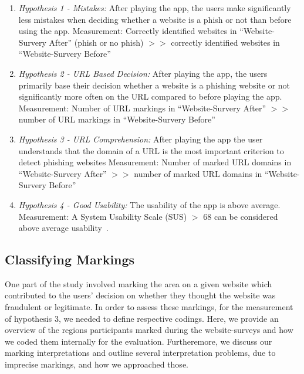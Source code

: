 \begin{enumerate}
	\item \textit{Hypothesis 1 - Mistakes:} After playing the app, the users make significantly less mistakes when deciding whether a website is a phish or not than before using the app.\newline
	Measurement: Correctly identified websites in ``Website-Survery After'' (phish or no phish) $>>$ correctly identified websites in ``Website-Survery Before''
	\item \textit{Hypothesis 2 - URL Based Decision:} After playing the app, the users primarily base their decision whether a website is a phishing website or not significantly more often on the URL compared to before playing the app.\newline
	Measurement: Number of URL markings in ``Website-Survery After'' $>>$ number of URL markings in ``Website-Survery Before''
	\item \textit{Hypothesis 3 - URL Comprehension:} After playing the app the user understands that the domain of a URL is the most important criterion to detect phishing websites\newline
Measurement: Number of marked URL domains in ``Website-Survery After''  $>>$ number of marked URL domains in ``Website-Survery Before'' 
	\item \textit{Hypothesis 4 - Good Usability:} The usability of the app is above average. \newline
Measurement: A System Usability Scale (SUS) $>$ 68 can be considered above average usability~\cite{sus}.
\end{enumerate}

\subsection{Classifying Markings}
\label{s:markings}
One part of the study involved marking the area on a given website which contributed to the users' decision on whether they thought the website was fraudulent or legitimate.
In order to assess these markings, for the measurement of hypothesis 3, we needed to define respective codings.
Here, we provide an overview of the regions participants marked during the website-surveys and how we coded them internally for the evaluation.
Furtheremore, we discuss our marking interpretations and outline several interpretation problems, due to imprecise markings, and how we approached those.

